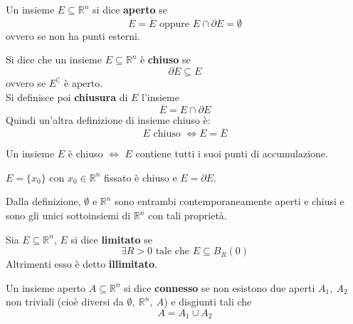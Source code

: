 \begin{definition}
    Un insieme $E \subseteq \mathbb{R}^n$ si dice \textbf{aperto} se
    \begin{equation}
        E=\mathring{E} \text{ oppure } E \cap \partial{E} = \emptyset
    \end{equation}
    ovvero se non ha punti esterni.
\end{definition}
\begin{definition} \label{Def: Insieme chiuso e chiusura}
    Si dice che un insieme $E \subseteq \mathbb{R}^n$ è \textbf{chiuso} se 
    \begin{equation}
        \partial{E} \subseteq E
    \end{equation}
    ovvero se $E^\complement$ è aperto.\\
    Si definisce poi \textbf{chiusura} di $E$ l'insieme
    \begin{equation}
        \overline{E} = E \cap \partial{E}
    \end{equation}
    Quindi un'altra definizione di insieme chiuso è:
    \begin{equation}
        E \text{ chiuso } \iff E=\overline{E}
    \end{equation}
\end{definition}
\begin{proposition}
    Un insieme $E$ è chiuso $\iff$ $E$ contiene tutti i suoi punti di accumulazione.
\end{proposition}
\begin{oss}
    $E=\{x_0\}$ con $x_0 \in \mathbb{R}^n$ fissato è chiuso e $E=\partial{E}$.
\end{oss}
\begin{oss}
    Dalla definizione, $\emptyset$ e $\mathbb{R}^n$ sono entrambi contemporaneamente aperti e chiusi e sono gli unici sottoinsiemi di $\mathbb{R}^n$ con tali proprietà.
\end{oss}
\begin{definition}
    Sia $E \subseteq \mathbb{R}^n$, $E$ si dice \textbf{limitato} se
    \begin{equation}
        \exists R>0 \text{ tale che } E \subseteq B_R(0)
    \end{equation}
    Altrimenti esso è detto \textbf{illimitato}.
\end{definition}
\begin{definition}
    Un insieme aperto $A\subseteq \mathbb{R}^n$ si dice \textbf{connesso} se non esistono due aperti $A_1, \ A_2$ non triviali (cioè diversi da $\emptyset,\ \mathbb{R}^n,\ A$) e disgiunti tali che
    \begin{equation}
        A=A_1 \cup A_2
    \end{equation}
\end{definition}
